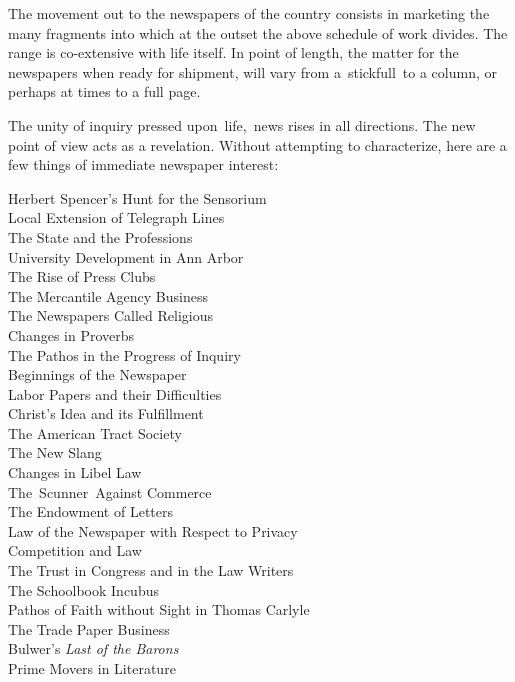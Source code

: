 \documentclass[twoside,symmetric,nobib,justified]{tufte-book}
\begin{document}
The movement out to the newspapers of the country consists in marketing
the many fragments into which at the outset the above schedule of work
divides. The range is co-extensive with life itself. In point of length,
the matter for the newspapers when ready for shipment, will vary from
a~stickfull~to a column, or perhaps at times to a full page.~

The unity of inquiry pressed upon~life,~news rises in all directions.
The new point of view acts as a revelation. Without attempting to
characterize, here are a few things of immediate newspaper interest:~

\vspace{.1in}

    


\noindent Herbert Spencer's Hunt for the Sensorium~\\
Local Extension of Telegraph Lines~\\
The State and the Professions\\
University Development in Ann Arbor~\\
The Rise of Press Clubs~\\
The Mercantile Agency Business~\\
The Newspapers Called Religious~\\
Changes in Proverbs~\\
The Pathos in the Progress of Inquiry~\\
Beginnings of the Newspaper~\\
Labor Papers and their Difficulties~\\
Christ's Idea and its Fulfillment~\\
The American Tract Society~\\
The New Slang~\\
Changes in Libel Law~\\
The~Scunner~Against Commerce~\\
The Endowment of Letters~\\
Law of the Newspaper with Respect to Privacy~\\
Competition and Law~\\
The Trust in Congress and in the Law Writers~\\
The Schoolbook Incubus~\\
Pathos of Faith without Sight in Thomas Carlyle~\\
The Trade Paper Business~\\
Bulwer's \emph{Last of the Barons}~\\
Prime Movers in Literature~\\
\end{document}
